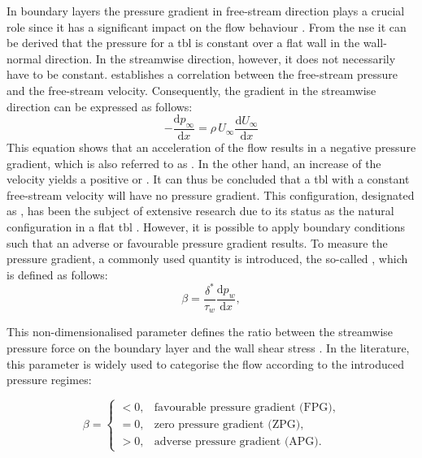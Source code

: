 In boundary layers the pressure gradient in free-stream direction plays a crucial role since it has a significant impact on the flow behaviour \citep{clauser_turbulent_1954}.
From the \acrshort{nse} it can be derived that the pressure for a \acrshort{tbl} is constant over a flat wall in the wall-normal direction.
In the streamwise direction, however, it does not necessarily have to be constant.
 establishes a correlation between the free-stream pressure and the free-stream velocity. Consequently, the gradient in the streamwise direction can be expressed as follows:
\begin{equation}\label{eq:bernoulli}
    -\frac{\mathrm{d}p_{\infty}}{\mathrm{d}x} = \rho\, U_{\infty} \frac{\mathrm{d}U_{\infty}}{\mathrm{d}x}
\end{equation}
This equation shows that an acceleration of the flow results in a negative pressure gradient, which is also referred to as . 
In the other hand, an increase of the velocity yields a positive or . 
It can thus be concluded that a \acrshort{tbl} with a constant free-stream velocity will have no pressure gradient.
This configuration, designated as , has been the subject of extensive research due to its status as the natural configuration in a flat \acrshort{tbl} \citep{spalart_direct_2024,schlatter_assessment_2010}.
However, it is possible to apply boundary conditions such that an adverse or favourable pressure gradient results.
To measure the pressure gradient, a commonly used quantity is introduced, the so-called , which is defined as follows:
\begin{equation}\label{eq:beta}
    \beta = \frac{\delta^*}{\tau_w} \frac{\mathrm{d}p_w}{\mathrm{d}x},
\end{equation}

This non-dimensionalised parameter defines the ratio between the streamwise pressure force on the boundary layer and the wall shear stress \citep{clauser_turbulent_1954}.
In the literature, this parameter is widely used to categorise the flow according to the introduced pressure regimes:

\begin{equation}
    \beta =
    \begin{cases}
        < 0, & \text{favourable pressure gradient (FPG)}, \\
        = 0, & \text{zero pressure gradient (ZPG)}, \\
        > 0, & \text{adverse pressure gradient (APG)}.
    \end{cases}
\end{equation}


